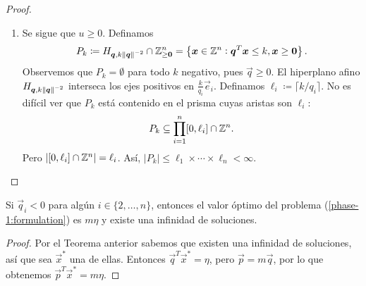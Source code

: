 \begin{proof}
\begin{enumerate}
\begin{equation}
\begin{cases}
					x_j + \sum_{i \in I^+}q_ic_i & k = j, \\
					x_k & \text{e.o.c}.
				\end{cases}
			\end{equation}
			Se verifica que $x^+$ es no negativo y, además,
			\begin{align*}
				\vec{q}^T\vec{x}^+
				&= \sum_{k \in I^+}q_k(x_k - c_kq_j) + q_j\left(x_j + \sum_{i \in I^+}c_iq_i\right)
				+ \sum_{k \in I^- \cup I^0 \setminus \lbrace j \rbrace}q_kx_k \\
				&= \sum_{k \in I^+}q_kx_k + q_jx_j + \sum_{k \in I^- \cup I^0 \setminus \lbrace j
				\rbrace}q_kx_k - q_j\sum_{k \in I^+}q_kc_k + q_j\sum_{i \in I^+}q_ic_i \\
				&= \vec{q}^T\vec{x} = \eta.
			\end{align*}
			Así pues, tenemos existencia. Para concluir que hay un número infinito de puntos, basta
			observar que si la elección de coeficientes $\lbrace c_i \rbrace_{i \in I^+}$ satisface
			(\ref{proof:non-negativity}), entonces cualquier múltiplo positivo de estos coeficientes
			también lo satisface. Finalmente, la demostración para el caso $j \in I^+$ es
			completamente análoga.
		\item Se sigue que $u \geq 0$. Definamos
			\begin{equation}
				P_k \coloneq H_{\boldsymbol{q}, k\left\lVert \boldsymbol{q} \right\rVert^{-2}} \cap \mathbb{Z}_{\geq \boldsymbol{0}}^n
				= \left\lbrace \boldsymbol{x} \in \mathbb{Z}^n \vcentcolon \boldsymbol{q}^T\boldsymbol{x} \leq k,
					\boldsymbol{x} \geq \boldsymbol{0} \right\rbrace.
			\end{equation}
			Observemos que $P_k = \emptyset$ para todo $k$ negativo, pues $\vec{q} \geq 0$. El
			hiperplano afino $H_{\boldsymbol{q}, k\left\lVert \boldsymbol{q} \right\rVert^{-2}}$ interseca los ejes positivos en
			$\frac{k}{q_i}\vec{e}_i$. Definamos $\ell_i \coloneq \lceil k/q_i \rceil$. No es difícil
			ver que $P_k$ está contenido en el prisma cuyas aristas son $\ell_i$:
			\begin{equation}
				P_k \subseteq \prod_{i = 1}^{n} [0, \ell_i] \cap \mathbb{Z}^n.
			\end{equation}
			Pero $\left| [0, \ell_i] \cap \mathbb{Z}^n \right| = \ell_i$. Así, $|P_k| \leq \ell_1 \times
			\cdots \times \ell_n < \infty$.
	\end{enumerate}
\end{proof}
\begin{corollary}
	Si $\vec{q}_i < 0$ para algún $i \in \lbrace 2, \ldots, n \rbrace$, entonces el valor óptimo del
	problema (\ref{phase-1:formulation}) es $m\eta$ y existe una infinidad de soluciones.
\end{corollary}
\begin{proof}
	Por el Teorema anterior sabemos que existen una infinidad de soluciones, así que sea $\vec{x}^*$
	una de ellas. Entonces $\vec{q}^T\vec{x}^* = \eta$, pero $\vec{p} = m\vec{q}$, por lo que
	obtenemos $\vec{p}^T\vec{x}^* = m\eta$.
\end{proof}

